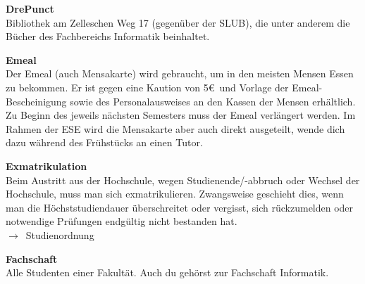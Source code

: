 \begin{multicols}{2}

\textbf{DrePunct} \\
Bibliothek am Zelleschen Weg 17 (gegenüber der SLUB), die unter anderem die Bücher des Fachbereichs Informatik beinhaltet.

\textbf{Emeal} \\
Der Emeal (auch Mensakarte) wird gebraucht, um in den meisten Mensen Essen zu bekommen.
Er ist gegen eine Kaution von 5\euro\ und Vorlage der Emeal-Bescheinigung sowie des Personalausweises an den Kassen der Mensen erhältlich.
Zu Beginn des jeweils nächsten Semesters muss der Emeal verlängert werden.
Im Rahmen der ESE wird die Mensakarte aber auch direkt ausgeteilt, wende dich dazu während des Frühstücks an einen Tutor.



\textbf{Exmatrikulation} \\
Beim Austritt aus der Hochschule, wegen Studienende/-abbruch oder Wechsel der Hochschule, muss man sich exmatrikulieren.
Zwangsweise geschieht dies, wenn man die Höchststudiendauer überschreitet oder vergisst, sich rückzumelden oder notwendige Prüfungen endgültig nicht bestanden hat.\\
$\rightarrow$~Studienordnung

\textbf{Fachschaft} \\
Alle Studenten einer Fakultät. Auch du gehörst zur Fachschaft Informatik.




\end{multicols}
